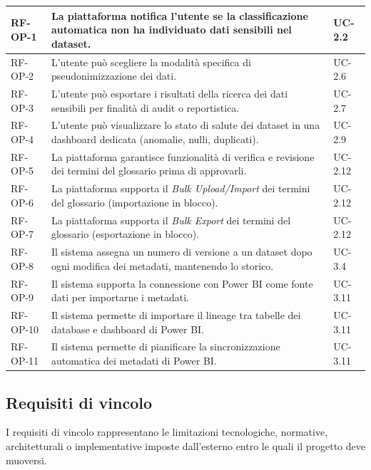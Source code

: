 \begin{longtable}{ p{} p{} p{} }
RF-OP-1 & La piattaforma notifica l'utente se la classificazione automatica non ha individuato dati sensibili nel dataset. & UC-2.2 \\ \midrule
RF-OP-2 & L'utente può scegliere la modalità specifica di pseudonimizzazione dei dati. & UC-2.6 \\ \midrule
RF-OP-3 & L'utente può esportare i risultati della ricerca dei dati sensibili per finalità di audit o reportistica. & UC-2.7 \\ \midrule
RF-OP-4 & L'utente può visualizzare lo stato di salute dei dataset in una dashboard dedicata (anomalie, nulli, duplicati). & UC-2.9 \\ \midrule
RF-OP-5 & La piattaforma garantisce funzionalità di verifica e revisione dei termini del glossario prima di approvarli. & UC-2.12 \\ \midrule
RF-OP-6 & La piattaforma supporta il \emph{Bulk Upload/Import} dei termini del glossario (importazione in blocco). & UC-2.12 \\ \midrule
RF-OP-7 & La piattaforma supporta il \emph{Bulk Export} dei termini del glossario (esportazione in blocco). & UC-2.12 \\ \midrule
RF-OP-8 & Il sistema assegna un numero di versione a un dataset dopo ogni modifica dei metadati, mantenendo lo storico. & UC-3.4 \\ \midrule
RF-OP-9 & Il sistema supporta la connessione con Power BI come fonte dati per importarne i metadati. & UC-3.11 \\ \midrule
RF-OP-10 & Il sistema permette di importare il lineage tra tabelle dei database e dashboard di Power BI. & UC-3.11 \\ \midrule
RF-OP-11 & Il sistema permette di pianificare la sincronizzazione automatica dei metadati di Power BI. & UC-3.11 \\

\end{longtable}


\subsection{Requisiti di vincolo}
I requisiti di vincolo rappresentano le limitazioni tecnologiche, normative, architetturali o implementative imposte dall'esterno entro le quali il progetto deve muoversi.

